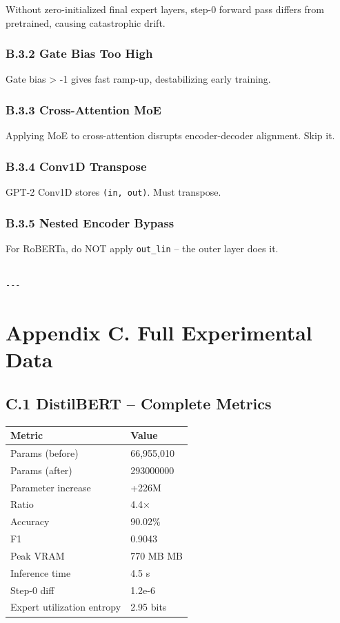 Without zero-initialized final expert layers, step-0 forward pass differs 
from pretrained, causing catastrophic drift.

\subsubsection{B.3.2 Gate Bias Too High}

Gate bias > -1 gives fast ramp-up, destabilizing early training.

\subsubsection{B.3.3 Cross-Attention MoE}

Applying MoE to cross-attention disrupts encoder-decoder alignment. Skip it.

\subsubsection{B.3.4 Conv1D Transpose}

GPT-2 Conv1D stores \texttt{(in, out)}. Must transpose.

\subsubsection{B.3.5 Nested Encoder Bypass}

For RoBERTa, do NOT apply \texttt{out\_lin} -- the outer layer does it.
\begin{lstlisting}

---
\end{lstlisting}

\section{Appendix C. Full Experimental Data}

\subsection{C.1 DistilBERT -- Complete Metrics}

\begin{table}[H]
\centering
\small
\begin{tabular}{ll}
\toprule
\textbf{Metric} & \textbf{Value} \\
\midrule
Params (before) & 66,955,010 \\
Params (after) & 293000000 \\
Parameter increase & +226M \\
Ratio & 4.4$\times$ \\
Accuracy & 90.02\% \\
F1 & 0.9043 \\
Peak VRAM & 770 MB MB \\
Inference time & 4.5 s \\
Step-0 diff & 1.2e-6 \\
Expert utilization entropy & 2.95 bits \\
\bottomrule
\end{tabular}
\end{table}

